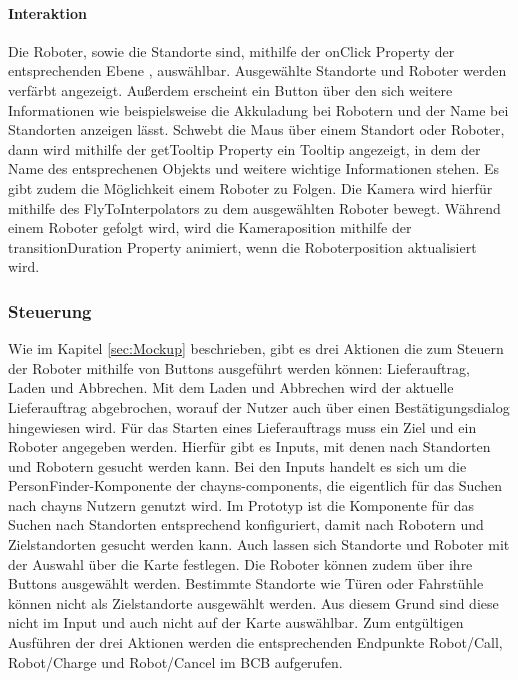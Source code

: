 \paragraph{Interaktion}
Die Roboter, sowie die Standorte sind, mithilfe der onClick Property der entsprechenden Ebene \cite{DeckglInteractivity}, auswählbar. Ausgewählte Standorte und Roboter werden verfärbt angezeigt. Außerdem erscheint ein Button über den sich weitere Informationen wie beispielsweise die Akkuladung bei Robotern und der Name bei Standorten anzeigen lässt. Schwebt die Maus über einem Standort oder Roboter, dann wird mithilfe der getTooltip Property \cite{DeckglDeckClass} ein Tooltip angezeigt, in dem der Name des entsprechenen Objekts und weitere wichtige Informationen stehen. Es gibt zudem die Möglichkeit einem Roboter zu Folgen. Die Kamera wird hierfür mithilfe des FlyToInterpolators \cite{DeckglFlyToInterpolator} zu dem ausgewählten Roboter bewegt. Während einem Roboter gefolgt wird, wird die Kameraposition mithilfe der transitionDuration Property \cite{DeckglAnimationsAndTransitions} animiert, wenn die Roboterposition aktualisiert wird.

\subsubsection{Steuerung}
Wie im Kapitel \ref{sec:Mockup} beschrieben, gibt es drei Aktionen die zum Steuern der Roboter mithilfe von Buttons ausgeführt werden können: Lieferauftrag, Laden und Abbrechen. Mit dem Laden und Abbrechen wird der aktuelle Lieferauftrag abgebrochen, worauf der Nutzer auch über einen Bestätigungsdialog hingewiesen wird. Für das Starten eines Lieferauftrags muss ein Ziel und ein Roboter angegeben werden. Hierfür gibt es Inputs, mit denen nach Standorten und Robotern gesucht werden kann. Bei den Inputs handelt es sich um die PersonFinder-Komponente \cite{ChaynsPersonFinder} der chayns-components, die eigentlich für das Suchen nach chayns Nutzern genutzt wird. Im Prototyp ist die Komponente für das Suchen nach Standorten entsprechend konfiguriert, damit nach Robotern und Zielstandorten gesucht werden kann. Auch lassen sich Standorte und Roboter mit der Auswahl über die Karte festlegen. Die Roboter können zudem über ihre Buttons ausgewählt werden. Bestimmte Standorte wie Türen oder Fahrstühle können nicht als Zielstandorte ausgewählt werden. Aus diesem Grund sind diese nicht im Input und auch nicht auf der Karte auswählbar. Zum entgültigen Ausführen der drei Aktionen werden die entsprechenden Endpunkte Robot/Call, Robot/Charge und Robot/Cancel im \ac{BCB} \cite{BCBSwagger} aufgerufen.

